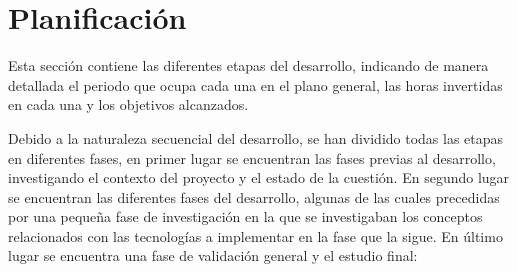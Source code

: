 \section{Planificación}
Esta sección contiene las diferentes etapas del desarrollo, indicando de manera
detallada el periodo que ocupa cada una en el plano general, las horas
invertidas en cada una y los objetivos alcanzados.

Debido a la naturaleza secuencial del desarrollo, se han dividido todas las
etapas en diferentes fases, en primer lugar se encuentran las fases previas al
desarrollo, investigando el contexto del proyecto y el estado de la cuestión. En
segundo lugar se encuentran las diferentes fases del desarrollo, algunas de las
cuales precedidas por una pequeña fase de investigación en la que se
investigaban los conceptos relacionados con las tecnologías a implementar en la
fase que la sigue. En último lugar se encuentra una fase de validación general y
el estudio final:
